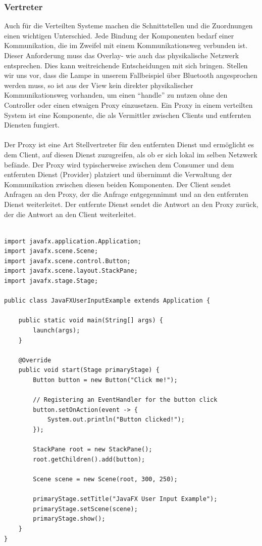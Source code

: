 \documentclass[../vs-script-first-v01.tex]{subfiles}
\begin{document}
\subsubsection{Vertreter}
Auch für die Verteilten Systeme machen die Schnittstellen und die Zuordnungen einen wichtigen Unterschied. Jede Bindung der Komponenten bedarf einer Kommunikation, die im Zweifel mit einem Kommunikationsweg  verbunden ist. Dieser Anforderung muss das Overlay- wie auch das physikalische Netzwerk entsprechen. Dies kann weitreichende Entscheidungen mit sich bringen. Stellen wir uns vor, dass die Lampe in unserem Fallbeispiel über Bluetooth angesprochen werden muss, so ist aus der View kein direkter physikalischer Kommunikationsweg vorhanden, um einen \enquote{handle} zu nutzen ohne den Controller oder einen etwaigen Proxy einzusetzen.  Ein Proxy in einem verteilten System ist eine Komponente, die als Vermittler zwischen Clients und entfernten Diensten fungiert. 
\\\\
Der Proxy ist eine Art Stellvertreter für den entfernten Dienst und ermöglicht es dem Client, auf diesen Dienst zuzugreifen, als ob er sich lokal im selben Netzwerk befände.
Der Proxy wird typischerweise zwischen dem Consumer und dem entfernten Dienst (Provider) platziert und übernimmt die Verwaltung der Kommunikation zwischen diesen beiden Komponenten. Der Client sendet Anfragen an den Proxy, der die Anfrage entgegennimmt und an den entfernten Dienst weiterleitet. Der entfernte Dienst sendet die Antwort an den Proxy zurück, der die Antwort an den Client weiterleitet.\\\\

\noindent\begin{minipage}{\textwidth}
\begin{lstlisting}[caption={Java FX Input},captionpos=b,label={lst:javafx-input}]
import javafx.application.Application;
import javafx.scene.Scene;
import javafx.scene.control.Button;
import javafx.scene.layout.StackPane;
import javafx.stage.Stage;

public class JavaFXUserInputExample extends Application {

    public static void main(String[] args) {
        launch(args);
    }

    @Override
    public void start(Stage primaryStage) {
        Button button = new Button("Click me!");

        // Registering an EventHandler for the button click
        button.setOnAction(event -> {
            System.out.println("Button clicked!");
        });

        StackPane root = new StackPane();
        root.getChildren().add(button);

        Scene scene = new Scene(root, 300, 250);

        primaryStage.setTitle("JavaFX User Input Example");
        primaryStage.setScene(scene);
        primaryStage.show();
    }
}
\end{lstlisting}
\end{minipage}
\end{document}
